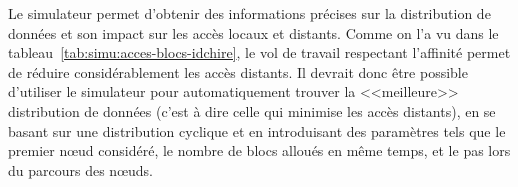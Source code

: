 Le simulateur permet d'obtenir des informations précises sur la distribution de données et son impact sur les accès locaux et distants.
Comme on l'a vu dans le tableau~\ref{tab:simu:acces-blocs-idchire}, le vol de travail respectant l'affinité permet de réduire considérablement les accès distants.
Il devrait donc être possible d'utiliser le simulateur pour automatiquement trouver la <<meilleure>> distribution de données (c'est à dire celle qui minimise les accès distants), en se basant sur une distribution cyclique et en introduisant des paramètres tels que le premier nœud considéré, le nombre de blocs alloués en même temps, et le pas lors du parcours des nœuds.

